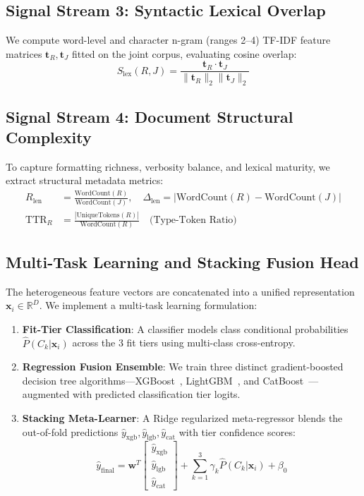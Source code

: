 \documentclass[conference]{IEEEtran}
\begin{document}
\subsection{Signal Stream 3: Syntactic Lexical Overlap}
We compute word-level and character n-gram (ranges 2--4) TF-IDF feature matrices $\mathbf{t}_R, \mathbf{t}_J$ fitted on the joint corpus, evaluating cosine overlap:
\begin{equation}
S_{\text{lex}}(R, J) = \frac{\mathbf{t}_R \cdot \mathbf{t}_J}{\|\mathbf{t}_R\|_2 \|\mathbf{t}_J\|_2}
\end{equation}

\subsection{Signal Stream 4: Document Structural Complexity}
To capture formatting richness, verbosity balance, and lexical maturity, we extract structural metadata metrics:
\begin{align}
R_{\text{len}} &= \frac{\text{WordCount}(R)}{\text{WordCount}(J)}, \quad \Delta_{\text{len}} = |\text{WordCount}(R) - \text{WordCount}(J)| \\
\text{TTR}_R &= \frac{|\text{UniqueTokens}(R)|}{\text{WordCount}(R)} \quad \text{(Type-Token Ratio)}
\end{align}

\subsection{Multi-Task Learning and Stacking Fusion Head}
The heterogeneous feature vectors are concatenated into a unified representation $\mathbf{x}_i \in \mathbb{R}^{D}$. We implement a multi-task learning formulation:
\begin{enumerate}
    \item \textbf{Fit-Tier Classification}: A classifier models class conditional probabilities $\hat{P}(C_k | \mathbf{x}_i)$ across the 3 fit tiers using multi-class cross-entropy.
    \item \textbf{Regression Fusion Ensemble}: We train three distinct gradient-boosted decision tree algorithms---XGBoost~\cite{chen2016}, LightGBM~\cite{ke2017lightgbm}, and CatBoost~\cite{prokhorenkova2018catboost}---augmented with predicted classification tier logits.
    \item \textbf{Stacking Meta-Learner}: A Ridge regularized meta-regressor blends the out-of-fold predictions $\hat{y}_{\text{xgb}}, \hat{y}_{\text{lgb}}, \hat{y}_{\text{cat}}$ with tier confidence scores:
    \begin{equation}
    \hat{y}_{\text{final}} = \mathbf{w}^T \begin{bmatrix} \hat{y}_{\text{xgb}} \\ \hat{y}_{\text{lgb}} \\ \hat{y}_{\text{cat}} \end{bmatrix} + \sum_{k=1}^3 \gamma_k \hat{P}(C_k | \mathbf{x}_i) + \beta_0
    \end{equation}
\end{enumerate}
\end{document}
